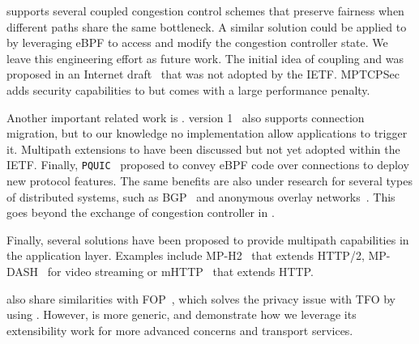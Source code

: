 \mptcp \cite{raiciu2012hard,rfc6824} supports several coupled congestion
control schemes \cite{peng2014multipath,wischik2011design,khalili2013mptcp} that preserve fairness when different paths share the same bottleneck. A similar solution  could be applied to \tcpls by leveraging eBPF to access and modify the  congestion controller state. We leave this engineering effort as future work. The initial idea of coupling \mptcp and \tls was proposed in an
Internet draft~\cite{draft-paasch-mptcp-ssl-00} that was not adopted by the
IETF. MPTCPSec~\cite{jadin2017securing} adds security capabilities to \mptcp but
comes with a large performance penalty.

Another important related work is \quic. %
\quic version 1~\cite{rfc9000} also supports connection migration, but to our knowledge no implementation allow applications to trigger  it. %
Multipath extensions
\cite{viernickel2018multipath,de2017multipath,draft-liu-multipath-quic-02}
to \quic have been discussed but not yet adopted within the IETF. Finally,
\texttt{PQUIC}~\cite{de2019pluginizing} proposed to convey eBPF code over \quic
connections to deploy new protocol features. The same benefits are also under
research for several types of distributed systems, such as BGP~\cite{xBGP} and
anonymous overlay networks~\cite{fan-hotpets}. This goes beyond the exchange of
congestion controller in \tcpls.

Finally, several solutions have been proposed to provide multipath capabilities
in the application layer. Examples include MP-H2~\cite{nikravesh2019mp} that
extends HTTP/2, MP-DASH~\cite{han2016mp} for video streaming or mHTTP~\cite{kim2014multi} that extends HTTP.

\tcpls also share similarities with \tls FOP~\cite{sy2020enhanced}, which
solves the privacy issue with TFO by using \tls. However, \tcpls is more generic, and demonstrate how we leverage its extensibility work for more advanced  concerns and transport services.


